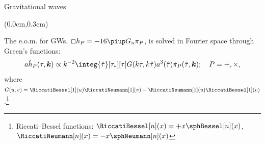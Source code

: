 \begin{frame}{Gravitational waves}
    
    \begin{textblock*}{\paperwidth-0.3cm}(0.0cm,0.3cm)
        \begin{flushright}
            \ifOnlyNotes\else
            \fi
        \end{flushright}
    \end{textblock*}

    The e.o.m. for GWs, \(\sq h_P = - 16 \piGN\pi_P\), %
    is solved in Fourier space through Green's functions:
    \begin{equation}
        a\tilde{h}_P(\tau, \vec{k}) \propto k^{-2} \integ{\hat{\tau}}[\tau_\ast][\tau] G(k\tau, k\hat{\tau}) a^3(\hat{\tau}) \tilde{\pi}_P  %
        (\hat{\tau}, \vec{k}); \quad P=+,\times,
    \end{equation}
    where $G(u,v) = \RiccatiBessel[1](u)\RiccatiNeumann[1](v)-\RiccatiNeumann[1](u)\RiccatiBessel[1](v)$.\footnote<1>[5]{Riccati--Bessel functions: \( \RiccatiBessel[n](x) =+  x\sphBessel[n](x) \), \( \RiccatiNeumann[n](x) =- x\sphNeumann[n](x) \)} %
    \par
    \medskip
    {\small{}}


\begin{notes}[1]
\end{notes}
\end{frame}



